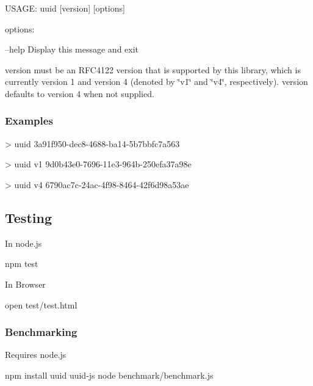 \begin{DoxyCode}
USAGE: uuid [version] [options]


options:

--help                     Display this message and exit
\end{DoxyCode}


{\ttfamily version} must be an R\+F\+C4122 version that is supported by this library, which is currently version 1 and version 4 (denoted by \char`\"{}v1\char`\"{} and \char`\"{}v4\char`\"{}, respectively). {\ttfamily version} defaults to version 4 when not supplied.

\subsubsection*{Examples}


\begin{DoxyCode}
> uuid
3a91f950-dec8-4688-ba14-5b7bbfc7a563
\end{DoxyCode}



\begin{DoxyCode}
> uuid v1
9d0b43e0-7696-11e3-964b-250efa37a98e
\end{DoxyCode}



\begin{DoxyCode}
> uuid v4
6790ac7c-24ac-4f98-8464-42f6d98a53ae
\end{DoxyCode}


\subsection*{Testing}

In node.\+js


\begin{DoxyCode}
npm test
\end{DoxyCode}


In Browser


\begin{DoxyCode}
open test/test.html
\end{DoxyCode}


\subsubsection*{Benchmarking}

Requires node.\+js


\begin{DoxyCode}
npm install uuid uuid-js
node benchmark/benchmark.js
\end{DoxyCode}



